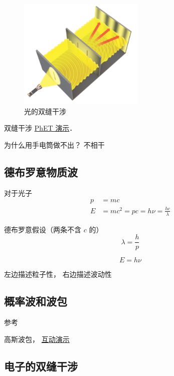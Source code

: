 \begin{figure}[ht]
\centering
\includegraphics[width=6cm]{./figures/QMIntr5.png}
\caption{光的双缝干涉} \label{QMIntr_fig5}
\end{figure}

双缝干涉 \href{https://phet.colorado.edu/sims/html/wave-interference/latest/wave-interference_en.html}{PhET 演示}．

为什么用手电筒做不出？ 不相干

\subsection{德布罗意物质波}

对于光子
\begin{equation}
\begin{aligned}
p &= mc
\\
E &= mc^2 = pc = h\nu = \frac{hc}{\lambda}
\end{aligned}
\end{equation}

德布罗意假设（两条不含 $c$ 的）
\begin{equation}
\lambda = \frac{h}{p}
\end{equation}

\begin{equation}
E = h\nu
\end{equation}

左边描述粒子性， 右边描述波动性

\subsection{概率波和波包}
参考

高斯波包， \href{http://wuli.wiki/apps/gausWP.html}{互动演示}

\subsection{电子的双缝干涉}

